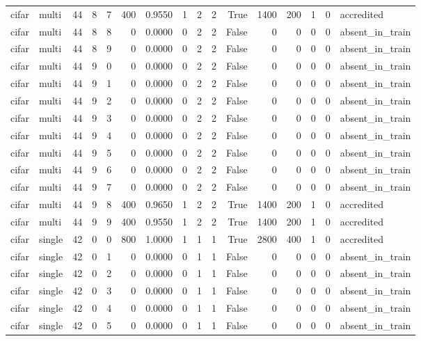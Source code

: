 \begin{tabular}{llrrrrrrrrrrrrrl}
cifar & multi & 44 & 8 & 7 & 400 & 0.9550 & 1 & 2 & 2 & True & 1400 & 200 & 1 & 0 & accredited \\
cifar & multi & 44 & 8 & 8 & 0 & 0.0000 & 0 & 2 & 2 & False & 0 & 0 & 0 & 0 & absent\_in\_train \\
cifar & multi & 44 & 8 & 9 & 0 & 0.0000 & 0 & 2 & 2 & False & 0 & 0 & 0 & 0 & absent\_in\_train \\
cifar & multi & 44 & 9 & 0 & 0 & 0.0000 & 0 & 2 & 2 & False & 0 & 0 & 0 & 0 & absent\_in\_train \\
cifar & multi & 44 & 9 & 1 & 0 & 0.0000 & 0 & 2 & 2 & False & 0 & 0 & 0 & 0 & absent\_in\_train \\
cifar & multi & 44 & 9 & 2 & 0 & 0.0000 & 0 & 2 & 2 & False & 0 & 0 & 0 & 0 & absent\_in\_train \\
cifar & multi & 44 & 9 & 3 & 0 & 0.0000 & 0 & 2 & 2 & False & 0 & 0 & 0 & 0 & absent\_in\_train \\
cifar & multi & 44 & 9 & 4 & 0 & 0.0000 & 0 & 2 & 2 & False & 0 & 0 & 0 & 0 & absent\_in\_train \\
cifar & multi & 44 & 9 & 5 & 0 & 0.0000 & 0 & 2 & 2 & False & 0 & 0 & 0 & 0 & absent\_in\_train \\
cifar & multi & 44 & 9 & 6 & 0 & 0.0000 & 0 & 2 & 2 & False & 0 & 0 & 0 & 0 & absent\_in\_train \\
cifar & multi & 44 & 9 & 7 & 0 & 0.0000 & 0 & 2 & 2 & False & 0 & 0 & 0 & 0 & absent\_in\_train \\
cifar & multi & 44 & 9 & 8 & 400 & 0.9650 & 1 & 2 & 2 & True & 1400 & 200 & 1 & 0 & accredited \\
cifar & multi & 44 & 9 & 9 & 400 & 0.9550 & 1 & 2 & 2 & True & 1400 & 200 & 1 & 0 & accredited \\
cifar & single & 42 & 0 & 0 & 800 & 1.0000 & 1 & 1 & 1 & True & 2800 & 400 & 1 & 0 & accredited \\
cifar & single & 42 & 0 & 1 & 0 & 0.0000 & 0 & 1 & 1 & False & 0 & 0 & 0 & 0 & absent\_in\_train \\
cifar & single & 42 & 0 & 2 & 0 & 0.0000 & 0 & 1 & 1 & False & 0 & 0 & 0 & 0 & absent\_in\_train \\
cifar & single & 42 & 0 & 3 & 0 & 0.0000 & 0 & 1 & 1 & False & 0 & 0 & 0 & 0 & absent\_in\_train \\
cifar & single & 42 & 0 & 4 & 0 & 0.0000 & 0 & 1 & 1 & False & 0 & 0 & 0 & 0 & absent\_in\_train \\
cifar & single & 42 & 0 & 5 & 0 & 0.0000 & 0 & 1 & 1 & False & 0 & 0 & 0 & 0 & absent\_in\_train \\

\end{tabular}
